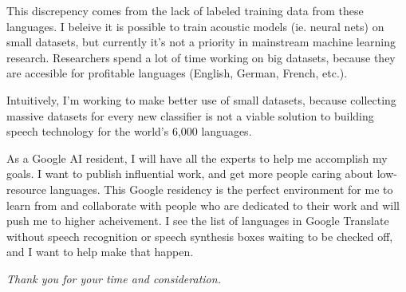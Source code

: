 \documentclass[12pt,a4paper]{article}
\begin{document}
This discrepency comes from the lack of labeled training data from these languages. I beleive it is possible to train acoustic models (ie. neural nets) on small datasets, but currently it's not a priority in mainstream machine learning research. Researchers spend a lot of time working on big datasets, because they are accesible for profitable languages (English, German, French, etc.).

Intuitively, I'm working to make better use of small datasets, because collecting massive datasets for every new classifier is not a viable solution to building speech technology for the world's 6,000 languages.

As a Google AI resident, I will have all the experts to help me accomplish my goals. I want to publish influential work, and get more people caring about low-resource languages. This Google residency is the perfect environment for me to learn from and collaborate with people who are dedicated to their work and will push me to higher acheivement. I see the list of languages in Google Translate without speech recognition or speech synthesis boxes waiting to be checked off, and I want to help make that happen.

\begin{center}
\textit{Thank you for your time and consideration.}  
\end{center}
\end{document}
